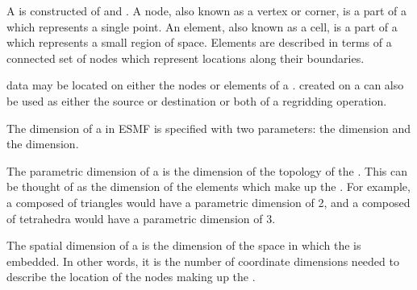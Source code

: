 \documentclass[letterpaper,10pt,english]{sphinxmanual}
\begin{document}
A {\hyperref[\detokenize{mesh:ESMF.api.mesh.Mesh}]{}} is constructed of  and . A node, also known as a vertex
or corner, is a part of a {\hyperref[\detokenize{mesh:ESMF.api.mesh.Mesh}]{}} which represents a single point. An element,
also known as a cell, is a part of a {\hyperref[\detokenize{mesh:ESMF.api.mesh.Mesh}]{}} which represents a small
region of space. Elements are described in terms of a connected set of nodes
which represent locations along their boundaries.

{\hyperref[\detokenize{field:ESMF.api.field.Field}]{}} data may be located on either the nodes or elements of a {\hyperref[\detokenize{mesh:ESMF.api.mesh.Mesh}]{}}. {\hyperref[\detokenize{field:ESMF.api.field.Field}]{}}
created on a {\hyperref[\detokenize{mesh:ESMF.api.mesh.Mesh}]{}} can also be used as either the source or destination or both
of a regridding operation.

The dimension of a {\hyperref[\detokenize{mesh:ESMF.api.mesh.Mesh}]{}} in ESMF is specified with two parameters: the
 dimension and the  dimension.

The parametric dimension of a {\hyperref[\detokenize{mesh:ESMF.api.mesh.Mesh}]{}} is the dimension of the topology of the {\hyperref[\detokenize{mesh:ESMF.api.mesh.Mesh}]{}}.
This can be thought of as the dimension of the elements which make up the {\hyperref[\detokenize{mesh:ESMF.api.mesh.Mesh}]{}}.
For example, a {\hyperref[\detokenize{mesh:ESMF.api.mesh.Mesh}]{}} composed of triangles would have a parametric dimension of
2, and a {\hyperref[\detokenize{mesh:ESMF.api.mesh.Mesh}]{}} composed of tetrahedra would have a parametric dimension of 3.

The spatial dimension of a {\hyperref[\detokenize{mesh:ESMF.api.mesh.Mesh}]{}} is the dimension of the space in which the {\hyperref[\detokenize{mesh:ESMF.api.mesh.Mesh}]{}}
is embedded. In other words, it is the number of coordinate dimensions needed to
describe the location of the nodes making up the {\hyperref[\detokenize{mesh:ESMF.api.mesh.Mesh}]{}}.
\end{document}
